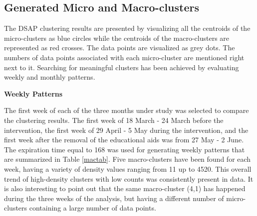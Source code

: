 \subsection{Generated Micro and Macro-clusters}

The DSAP clustering results are presented by visualizing all the centroids of the micro-clusters as blue circles while the centroids of the macro-clusters are represented as red crosses. The data points are visualized as grey dots. The numbers of data points associated with each micro-cluster are mentioned right next to it. Searching for meaningful clusters has been achieved by evaluating weekly and monthly patterns.


\textbf{Weekly Patterns}

The first week of each of the three months under study was selected to compare the clustering results. The first week of 18 March - 24 March before the intervention, the first week of 29 April - 5 May during the intervention, and the first week after the removal of the educational aids was from 27 May - 2 June. The expiration time equal to 168 was used for generating weekly patterns that are summarized in Table \ref{mactab}. Five macro-clusters have been found for each week, having a variety of density values ranging from 11 up to 4520. This overall trend of high-density clusters with low counts was consistently present in data. It is also interesting to point out that the same macro-cluster (4,1) has happened during the three weeks of the analysis, but having a different number of micro-clusters containing a large number of data points. 

